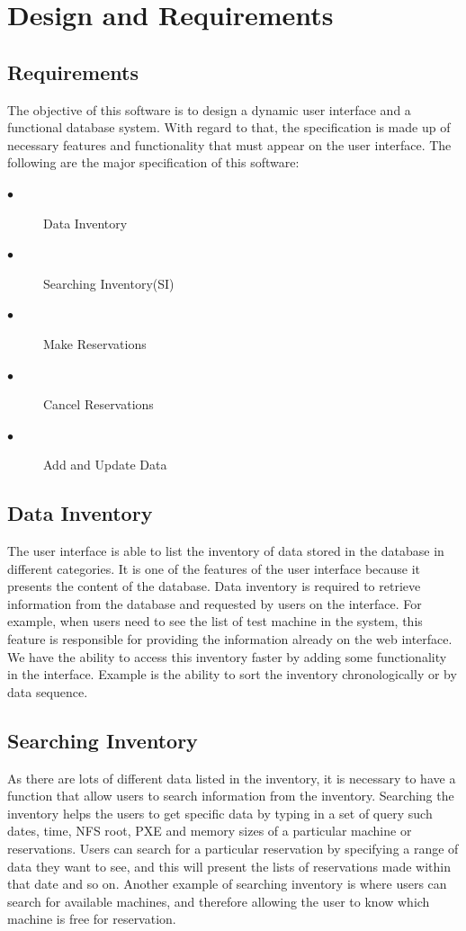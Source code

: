 \chapter{Design and Requirements}
\label{chap:figtab}
\label{chap}
\section{Requirements}
The objective of this software is to  design a dynamic user interface and a functional database system. With regard to that, the specification is made up of necessary features and functionality that must appear on the user interface. The following are the major specification of this software:
\begin{description}
\item[$\bullet$] Data Inventory
\item[$\bullet$] Searching Inventory(SI)
\item[$\bullet$] Make Reservations
\item[$\bullet$] Cancel Reservations
\item[$\bullet$] Add and Update Data
\end{description}
\section*{Data Inventory}
The user interface is able to list the inventory of data stored in the database in different categories. It is one of the features of the user interface because it presents the content of the database. Data inventory is required to retrieve information from the database and requested by users on the interface. For example, when users need to see the list of test machine in the system, this feature is responsible for providing the information already on the web interface. We have the ability to access this inventory faster by adding some functionality in the interface. Example is the ability to sort the inventory chronologically or by data sequence. 
\section*{Searching Inventory}
As there are lots of different data listed in the inventory, it is necessary to have a function that allow users to search information from the inventory. Searching the inventory helps the users to get specific data by typing in a set of query such dates, time, NFS root, PXE and memory sizes of a particular machine or reservations. Users can search for a particular reservation by specifying a range of data they want to see, and this will present the lists of reservations made within that date and so on. Another example of searching inventory is where users can search for available machines, and therefore allowing the user to know which machine is free for reservation.
